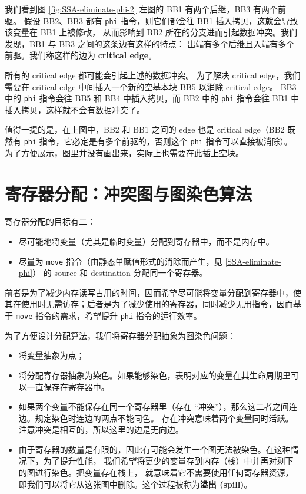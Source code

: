 我们看到图 \ref{fig:SSA-eliminate-phi-2} 左图的 BB1 有两个后继，BB3 有两个前驱。
假设 BB2、BB3 都有 \texttt{phi} 指令，则它们都会往 BB1 插入拷贝，这就会导致该变量在 BB1 上被修改，
从而影响到 BB2 所在的分支进而引起数据冲突。我们发现，BB1 与 BB3 之间的这条边有这样的特点：
出端有多个后继且入端有多个前驱。我们称这样的边为 \textbf{critical edge}。

所有的 critical edge 都可能会引起上述的数据冲突。
为了解决 critical edge，我们需要在 critical edge 中间插入一个新的空基本块 BB5 以消除 critical edge。
BB3 中的 \texttt{phi} 指令会往 BB5 和 BB4 中插入拷贝，而 BB2 中的 \texttt{phi} 指令会往
BB1 中插入拷贝，这样就不会有数据冲突了。

值得一提的是，在上图中，BB2 和 BB1 之间的 edge 也是 critical edge（BB2 既然有
\texttt{phi} 指令，它必定是有多个前驱的，否则这个 \texttt{phi} 指令可以直接被消除）。
为了方便展示，图里并没有画出来，实际上也需要在此插上空块。

\section{寄存器分配：冲突图与图染色算法}

寄存器分配的目标有二：
\begin{itemize}
    \item 尽可能地将变量（尤其是临时变量）分配到寄存器中，而不是内存中。
    \item 尽量为 \texttt{move} 指令（由静态单赋值形式的消除而产生，见 \ref{SSA-eliminate-phi}）
        的 source 和 destination 分配同一个寄存器。
\end{itemize}
前者是为了减少内存读写占用的时间，因而希望尽可能将变量分配到寄存器中，使其在使用时无需访存；后者是为了减少使用的寄存器，同时减少无用指令，因而基于 \texttt{move} 指令的需求，希望提升 \texttt{phi} 指令的运行效率。

为了方便设计分配算法，我们将寄存器分配抽象为图染色问题：
\begin{itemize}
    \item 将变量抽象为点；
    \item 将分配寄存器抽象为染色。如果能够染色，表明对应的变量在其生命周期里可以一直保存在寄存器中。
    \item 如果两个变量不能保存在同一个寄存器里（存在 “冲突”），那么这二者之间连边。规定染色时连边的两点不能同色。
        存在冲突意味着两个变量同时活跃。注意冲突是相互的，所以这里的边是无向边。
    \item 由于寄存器的数量是有限的，因此有可能会发生一个图无法被染色。在这种情况下，为了提升性能，
        我们希望将更少的变量存到内存（栈）中并再对剩下的图进行染色。把变量存在栈上，
        就意味着它不需要使用任何寄存器资源，即我们可以将它从这张图中删除。这个过程被称为\textbf{溢出 (spill)}。
\end{itemize}

